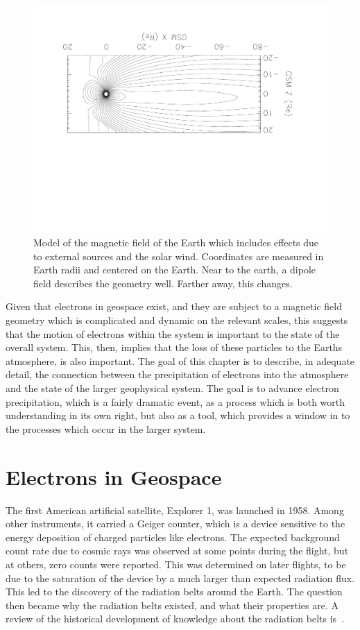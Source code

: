 \begin{figure}[p]
\label{magnetosphere_diagram}
\centering
\includegraphics[width=1.1\textwidth,angle=180]{figures/chapter_2/magnetosphere_diagram/magnetosphere_diagram}
\caption{Model of the magnetic field of the Earth which includes effects due to external sources and the solar wind. Coordinates are measured in Earth radii and centered on the Earth. Near to the earth, a dipole field describes the geometry well. Farther away, this changes. }
\end{figure}

Given that electrons in geospace exist, and they are subject to a magnetic field geometry which is complicated and dynamic on the relevant scales, this suggests that the motion of electrons within the system is important to the state of the overall system. This, then, implies that the loss of these particles to the Earths atmosphere, is also important. The goal of this chapter is to describe, in adequate detail, the connection between the precipitation of electrons into the atmosphere and the state of the larger geophysical system. The goal is to advance electron precipitation, which is a fairly dramatic event, as a process which is both worth understanding in its own right, but also as a tool, which provides a window in to the processes which occur in the larger system. 

\section{Electrons in Geospace}

The first American artificial satellite, Explorer 1, was launched in 1958. Among other instruments, it carried a Geiger counter, which is a device sensitive to the energy deposition of charged particles like electrons. The expected background count rate due to cosmic rays was observed at some points during the flight, but at others, zero counts were reported. This was determined on later flights, to be due to the saturation of the device by a much larger than expected radiation flux. This led to the discovery of the radiation belts around the Earth. The question then became why the radiation belts existed, and what their properties are. A review of the historical development of knowledge about the radiation belts is~\cite{baker2012}. 

